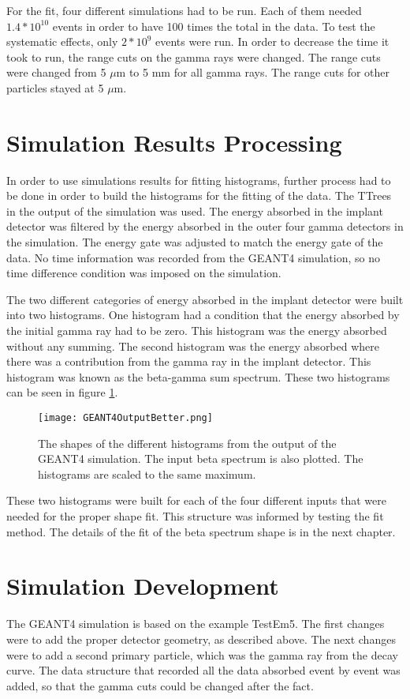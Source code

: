 \documentclass[../MaxHughesThesis.tex]{subfiles}
\begin{document}
For the fit, four different simulations had to be run.
Each of them needed $1.4 * 10^{10}$ events in order to have 100 times the total in the data.
To test the systematic effects, only $2 * 10^{9}$ events were run.
In order to decrease the time it took to run, the range cuts on the gamma rays were changed.
The range cuts were changed from 5 $\mu$m to 5 mm for all gamma rays.
The range cuts for other particles stayed at 5 $\mu$m.

\section{Simulation Results Processing}
In order to use simulations results for fitting histograms, further process had to be done in order to build the histograms for the fitting of the data. 
The TTrees in the output of the simulation was used. 
The energy absorbed in the implant detector was filtered by the energy absorbed in the outer four gamma detectors in the simulation.
The energy gate was adjusted to match the energy gate of the data.
No time information was recorded from the GEANT4 simulation, so no time difference condition was imposed on the simulation. 

The two different categories of energy absorbed in the implant detector were built into two histograms. 
One histogram had a condition that the energy absorbed by the initial gamma ray had to be zero.
This histogram was the energy absorbed without any summing.
The second histogram was the energy absorbed where there was a contribution from the gamma ray in the implant detector.
This histogram was known as the beta-gamma sum spectrum.
These two histograms can be seen in figure \ref{fig:GEANT4Hists}.

\begin{figure}[!htb]
	\centerline{\texttt{[image: GEANT4OutputBetter.png]}}
	\caption{The shapes of the different histograms from the output of the GEANT4 simulation.
		 The input beta spectrum is also plotted.
		 The histograms are scaled to the same maximum.}
	\label{fig:GEANT4Hists}
\end{figure}

These two histograms were built for each of the four different inputs that were needed for the proper shape fit. 
This structure was informed by testing the fit method.
The details of the fit of the beta spectrum shape is in the next chapter. 

\section{Simulation Development}
The GEANT4 simulation is based on the example TestEm5.
The first changes were to add the proper detector geometry, as described above.
The next changes were to add a second primary particle, which was the gamma ray from the decay curve.
The data structure that recorded all the data absorbed event by event was added, so that the gamma cuts could be changed after the fact.
\end{document}
